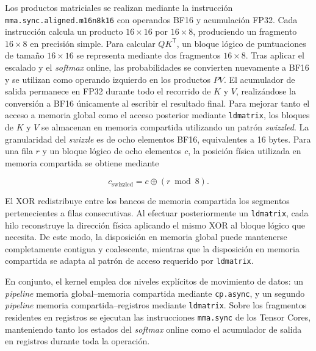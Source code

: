 Los productos matriciales se realizan mediante la instrucción \texttt{mma.sync.aligned.m16n8k16} con operandos BF16 y acumulación FP32. Cada instrucción calcula un producto \(16\times16\) por \(16\times8\), produciendo un fragmento \(16\times8\) en precisión simple. Para calcular \(QK^\mathsf{T}\), un bloque lógico de puntuaciones de tamaño \(16\times16\) se representa mediante dos fragmentos \(16\times8\). Tras aplicar el escalado y el \textit{softmax} online, las probabilidades se convierten nuevamente a BF16 y se utilizan como operando izquierdo en los productos \(PV\). El acumulador de salida permanece en FP32 durante todo el recorrido de \(K\) y \(V\), realizándose la conversión a BF16 únicamente al escribir el resultado final.
Para mejorar tanto el acceso a memoria global como el acceso posterior mediante \texttt{ldmatrix}, los bloques de \(K\) y \(V\) se almacenan en memoria compartida utilizando un patrón \textit{swizzled}. La granularidad del \textit{swizzle} es de ocho elementos BF16, equivalentes a 16 bytes. Para una fila \(r\) y un bloque lógico de ocho elementos \(c\), la posición física utilizada en memoria compartida se obtiene mediante

$$
c_{\mathrm{swizzled}} = c \oplus (r \bmod 8).
$$

El XOR redistribuye entre los bancos de memoria compartida los segmentos pertenecientes a filas consecutivas. Al efectuar posteriormente un \texttt{ldmatrix}, cada hilo reconstruye la dirección física aplicando el mismo XOR al bloque lógico que necesita. De este modo, la disposición en memoria global puede mantenerse completamente contigua y coalescente, mientras que la disposición en memoria compartida se adapta al patrón de acceso requerido por \texttt{ldmatrix}.

En conjunto, el kernel emplea dos niveles explícitos de movimiento de datos: un \textit{pipeline} memoria global--memoria compartida mediante \texttt{cp.async}, y un segundo \textit{pipeline} memoria compartida--registros mediante \texttt{ldmatrix}. Sobre los fragmentos residentes en registros se ejecutan las instrucciones \texttt{mma.sync} de los Tensor Cores, manteniendo tanto los estados del \textit{softmax} online como el acumulador de salida en registros durante toda la operación.

